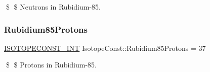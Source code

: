 \$ \$ Neutrons in Rubidium-\/85. \mbox{\label{group___isotope_const-_rubidium-_rb85_gacc34e99b2ffd05e841d0563c74ce704f}} 
\subsubsection{\texorpdfstring{Rubidium85\+Protons}{Rubidium85Protons}}
{\footnotesize\ttfamily \mbox{\hyperlink{group___isotope_const-_macros_ga5f18360b3e99483a35c32d789e62621c}{I\+S\+O\+T\+O\+P\+E\+C\+O\+N\+S\+T\+\_\+\+I\+NT}} Isotope\+Const\+::\+Rubidium85\+Protons = 37}

\$ \$ Protons in Rubidium-\/85. 